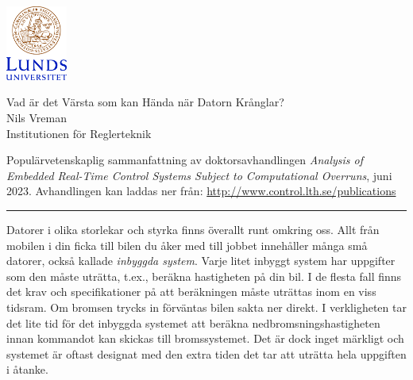 \documentclass[svenska]{style/LTHthesis}
\begin{document}
\noindent
\begin{minipage}[]{0.25\textwidth}
    \noindent\includegraphics[width=20mm]{style/LUCsv}
    \par\vspace*{3mm} 
\end{minipage}\hfill
\begin{minipage}[]{0.74\textwidth}
    \vspace*{-3mm}
    \sffamily
    \begin{flushleft}
        \huge Vad är det Värsta som kan Hända när Datorn Krånglar? \\[2mm]
        \Large Nils Vreman\\[1mm]
        \normalsize Institutionen för Reglerteknik
    \end{flushleft}
\end{minipage}

\par\vspace{1mm}  

\begin{sffamily}\noindent
    Populärvetenskaplig sammanfattning av doktorsavhandlingen \emph{Analysis of Embedded Real-Time Control Systems Subject to Computational Overruns}, juni 2023.
    Avhandlingen kan laddas ner från: \url{http://www.control.lth.se/publications}
\end{sffamily}

\vspace{2mm}\hrule\vspace{3mm}

\noindent
Datorer i olika storlekar och styrka finns överallt runt omkring oss.
Allt från mobilen i din ficka till bilen du åker med till jobbet innehåller många små datorer, också kallade \emph{inbyggda system}.
Varje litet inbyggt system har uppgifter som den måste uträtta, t.ex., beräkna hastigheten på din bil.
I de flesta fall finns det krav och specifikationer på att beräkningen måste uträttas inom en viss tidsram.
Om bromsen trycks in förväntas bilen sakta ner direkt.
I verkligheten tar det lite tid för det inbyggda systemet att beräkna nedbromsningshastigheten innan kommandot kan skickas till bromssystemet.
Det är dock inget märkligt och systemet är oftast designat med den extra tiden det tar att uträtta hela uppgiften i åtanke.
\end{document}
